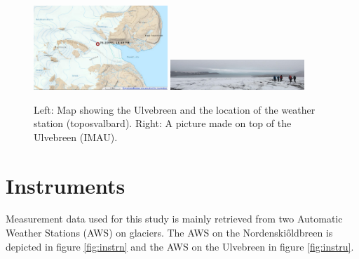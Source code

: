 \documentclass[11pt]{report}
\begin{document}
\begin{figure}[h]
\includegraphics[scale=1, width=0.45\textwidth]{ulvemap.jpg}
\includegraphics[scale=1, width=0.45\textwidth]{view2.jpg}
\centering{}
\caption{Left: Map showing the Ulvebreen and the location of the weather station (toposvalbard). Right: A picture made on top of the Ulvebreen (IMAU).}
\label{fig:ulve}
\end{figure}

\newpage
\section{Instruments}\label{sec:instr}
Measurement data used for this study is mainly retrieved from two Automatic Weather Stations (AWS) on glaciers. The AWS on the Nordenski\H{o}ldbreen is depicted in figure \ref{fig:instrn} and the AWS on the Ulvebreen in figure \ref{fig:instru}.
\end{document}
